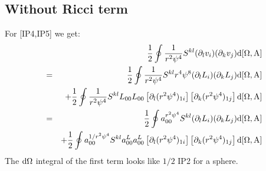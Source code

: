 \documentclass[11pt]{article}
\begin{document}
\subsection{Without Ricci term}
For [IP4,IP5] we get:
\begin{eqnarray}
&&\frac{1}{2} \oint \frac{1}{r^2 \psi^4} S^{kl} (\partial_l v_i)(\partial_k v_j) {\rm d [\Omega,A]} \\
&=& \frac{1}{2} \oint \frac{1}{r^2 \psi^4} S^{kl} r^4\psi^8 (\partial_l L_i)(\partial_k L_j) {\rm d [\Omega,A]} \\ \nonumber
&& + \frac{1}{2} \oint \frac{1}{r^2 \psi^4} S^{kl} L_{00} L_{00} \left[ \partial_l (r^2\psi^4)_{1i} \right] \left[ \partial_k (r^2\psi^4)_{1j} \right] {\rm d [\Omega,A]} \\ 
&=& \frac{1}{2} \oint a_{00}^{r^2\psi^4} S^{kl}  (\partial_l L_i)(\partial_k L_j) {\rm d [\Omega,A]} \\ \nonumber
&&+\frac{1}{2} \oint a_{00}^{1/r^2 \psi^4} S^{kl} a_{00}^L a_{00}^L  \left[ \partial_l (r^2\psi^4)_{1i} \right] \left[ \partial_k (r^2\psi^4)_{1j} \right] {\rm d [\Omega,A]}
\end{eqnarray}
The ${\rm d\Omega}$ integral of the first term looks like $1/2$ IP2 for a sphere.











%
%
\end{document}
